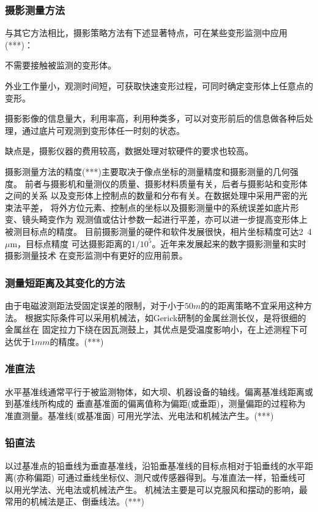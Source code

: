 \subsubsection{摄影测量方法}
与其它方法相比，摄影策略方法有下述显著特点，可在某些变形监测中应用(***)：
\begin{asparaitem}[$\bullet$]
\item 不需要接触被监测的变形体。
\item 外业工作量小，观测时间短，可获取快速变形过程，可同时确定变形体上任意点的变形。
\item 摄影影像的信息量大，利用率高，利用种类多，可以对变形前后的信息做各种后处理，通过底片可观测到变形体任一时刻的状态。
\item 缺点是，摄影仪器的费用较高，数据处理对软硬件的要求也较高。
\end{asparaitem}
摄影测量方法的精度(***)主要取决于像点坐标的测量精度和摄影测量的几何强度。
前者与摄影机和量测仪的质量、摄影材料质量有关，后者与摄影站和变形体之间的关系
以及变形体上控制点的数量和分布有关。在数据处理中采用严密的光束法平差，
将外方位元素、控制点的坐标以及摄影测量中的系统误差如底片形变、镜头畸变作为
观测值或估计参数一起进行平差，亦可以进一步提高变形体上被测目标点的精度。
目前摄影测量的硬件和软件发展很快，相片坐标精度可达2~4${\mu}$m，目标点精度
可达摄影距离的${1/10^5}$。近年来发展起来的数字摄影测量和实时摄影测量技术
在变形监测中有更好的应用前景。
\subsubsection{测量短距离及其变化的方法}
由于电磁波测距法受固定误差的限制，对于小于$50m$的的距离策略不宜采用这种方法。
根据实际条件可以采用机械法，如Gerick研制的金属丝测长仪，是将很细的金属丝在
固定拉力下绕在因瓦测鼓上，其优点是受温度影响小，在上述测程下可达优于$1mm$的精度。(***)
\subsubsection{准直法}
水平基准线通常平行于被监测物体，如大坝、机器设备的轴线。偏离基准线距离或到基准线所构成的
垂直基准面的偏离值称为偏距(或垂距)，测量偏距的过程称为准直测量。基准线(或基准面)
可用光学法、光电法和机械法产生。(***)
\subsubsection{铅直法}
以过基准点的铅垂线为垂直基准线，沿铅垂基准线的目标点相对于铅垂线的水平距离(亦称偏距)
可通过垂线坐标仪、测尺或传感器得到。与准直法一样，铅垂线可以用光学法、光电法或机械法产生。
机械法主要是可以克服风和摆动的影响，最常用的机械法是正、倒垂线法。(***)
